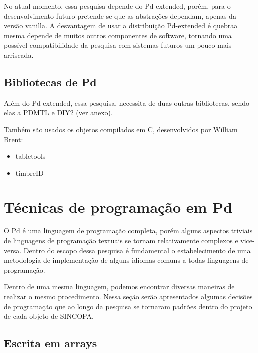 \documentclass{ppgmus}
\begin{document}
No atual momento, essa pesquisa depende do Pd-extended, porém, para o desenvolvimento futuro pretende-se
que as abstrações dependam, apenas da versão vanilla. A desvantagem de usar a distribuição Pd-extended é quebraa mesma 
depende de muitos outros componentes de software, tornando uma possível compatibilidade da pesquisa com sistemas
futuros um pouco mais arriscada. 


\subsection{Bibliotecas de Pd}

Além do Pd-extended, essa pesquisa, necessita de duas outras bibliotecas, sendo elas a PDMTL e DIY2 (ver anexo).

Também são usados os objetos compilados em C, desenvolvidos por William Brent:

\begin{itemize}
 \item tabletools
 \item timbreID
\end{itemize}







\section{Técnicas de programação em Pd}
\label{tecnicas}


O Pd é uma linguagem de programação completa, porém alguns aspectos triviais
de linguagens de programação textuais se tornam relativamente complexos e vice-versa.
Dentro do escopo dessa pesquisa é fundamental o estabelecimento de uma metodologia de
implementação de alguns idiomas comuns a todas linguagens de programação.

Dentro de uma mesma linguagem, podemos encontrar diversas maneiras
de realizar o mesmo procedimento. Nessa seção serão apresentados algumas decisões de programação 
que ao longo da pesquisa se tornaram padrões dentro do projeto de cada
objeto de SINCOPA.
 
\subsection{Escrita em arrays}
\end{document}
